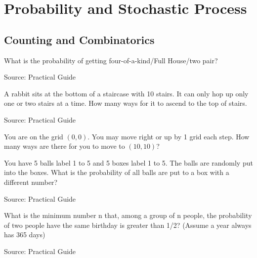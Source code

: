\chapter{Probability and Stochastic Process}
\section{Counting and Combinatorics}
\begin{exe}
What is the probability of getting four-of-a-kind/Full House/two pair?
\end{exe}
Source: Practical Guide
\begin{teacher}
\begin{sol}
\end{sol}
\end{teacher}

\begin{exe}
A rabbit sits at the bottom of a staircase with 10 stairs. It can only hop up only one or two stairs at a time. How many ways for it to ascend to the top of stairs.
\end{exe}
Source: Practical Guide
\begin{teacher}
\begin{sol}
\end{sol}
\end{teacher}

\begin{exe}
You are on the grid $(0, 0)$. You may move right or up by 1 grid each step. How many ways are there for you to move to $(10, 10)$?
\end{exe}
\begin{teacher}
\begin{sol}
\end{sol}
\end{teacher}

\begin{exe}
You have 5 balls label 1 to 5 and 5 boxes label 1 to 5. The balls are randomly put into the boxes. What is the probability of all balls are put to a box with a different number?
\end{exe}
Source: Practical Guide
\begin{teacher}
\begin{sol}
\end{sol}
\end{teacher}

\begin{exe}
What is the minimum number n that, among a group of n people, the probability of two people have the same birthday is greater than 1/2? (Assume a year always has 365 days)
\end{exe}
\begin{teacher}
Source: Practical Guide
\begin{sol}
\end{sol}
\end{teacher}






